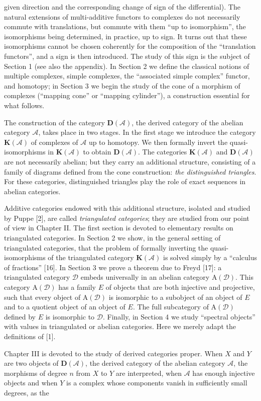 %
given direction and the corresponding change of sign of the differential).
The natural extensions of multi-additive functors to complexes do not
necessarily commute with translations, but commute with them “up to
isomorphism”, the isomorphisms being determined, in practice, up to sign. It
turns out that these isomorphisms cannot be chosen coherently for the
composition of the “translation functors”, and a sign is then introduced.
The study of this sign is the subject of Section 1 (see also the appendix).
In Section 2 we define the classical notions of multiple complexes, simple
complexes, the “associated simple complex” functor, and homotopy; in Section
3 we begin the study of the cone of a morphism of complexes (“mapping cone”
or “mapping cylinder”), a construction essential for what follows.

The construction of the category $\mathbf D(\mathcal A)$, the derived
category of the abelian category $\mathcal A$, takes place in two stages. In
the first stage we introduce the category $\mathbf K(\mathcal A)$ of
complexes of $\mathcal A$ up to homotopy. We then formally invert the
quasi-isomorphisms in $\mathbf K(\mathcal A)$ to obtain
$\mathbf D(\mathcal A)$. The categories $\mathbf K(\mathcal A)$ and
$\mathbf D(\mathcal A)$ are not necessarily abelian; but they carry an
additional structure, consisting of a family of diagrams defined from the
cone construction: \emph{the distinguished triangles}. For these
categories, distinguished triangles play the role of exact sequences in
abelian categories.

Additive categories endowed with this additional structure, isolated and
studied by Puppe [2], are called \emph{triangulated categories}; they are
studied from our point of view in Chapter II. The first section is devoted to
elementary results on triangulated categories. In Section 2 we show, in the
general setting of triangulated categories, that the problem of formally
inverting the quasi-isomorphisms of the triangulated category
$\mathbf K(\mathcal A)$ is solved simply by a “calculus of fractions” [16].
In Section 3 we prove a theorem due to Freyd [17]: a triangulated category
$\mathcal D$ embeds universally in an abelian category
$\mathrm A(\mathcal D)$. This category $\mathrm A(\mathcal D)$ has a
family $E$ of objects that are both injective and projective, such that every
object of $\mathrm A(\mathcal D)$ is isomorphic to a subobject of an object
of $E$ and to a quotient object of an object of $E$. The full subcategory of
$\mathrm A(\mathcal D)$ defined by $E$ is isomorphic to $\mathcal D$.
Finally, in Section 4 we study “spectral objects” with values in triangulated
or abelian categories. Here we merely adapt the definitions of [1].

Chapter III is devoted to the study of derived categories proper. When $X$
and $Y$ are two objects of $\mathbf D(\mathcal A)$, the derived category of
the abelian category $\mathcal A$, the morphisms of degree $n$ from $X$ to
$Y$ are interpreted, when $\mathcal A$ has enough injective objects and
when $Y$ is a complex whose components vanish in sufficiently small degrees,
as the
